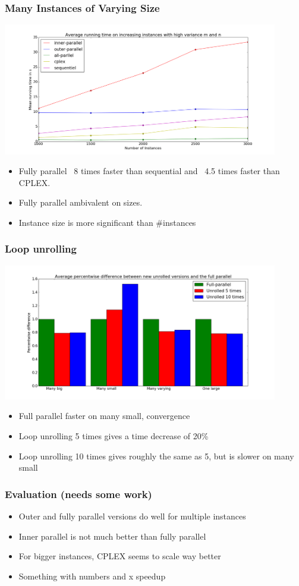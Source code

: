 \documentclass[handout]{beamer}
\begin{document}
\begin{frame}[fragile]
\frametitle{Many Instances of Varying Size}
\centering
\includegraphics[width=0.9\textwidth]{../Doc/figures/many-varying}
\begin{itemize}
	\item Fully parallel ~8 times faster than sequential and ~4.5 times faster than CPLEX.
	\item Fully parallel ambivalent on sizes.
	\item Instance size is more significant than \#instances
\end{itemize}
\end{frame}

\begin{frame}[fragile]
\frametitle{Loop unrolling}
\centering
\includegraphics[width=0.9\textwidth]{../Doc/figures/unrolling}
\begin{itemize}
	\item Full parallel faster on many small, convergence
	\item Loop unrolling 5 times gives a time decrease of 20\%
  \item Loop unrolling 10 times gives roughly the same as 5, but is slower on many small
\end{itemize}
\end{frame}

\begin{frame}
\frametitle{Evaluation (needs some work)}
\begin{itemize}
\item Outer and fully parallel versions do well for multiple instances
\item Inner parallel is not much better than fully parallel
\item For bigger instances, CPLEX seems to scale way better
\item Something with numbers and x speedup
\end{itemize}
\end{frame}
\end{document}
